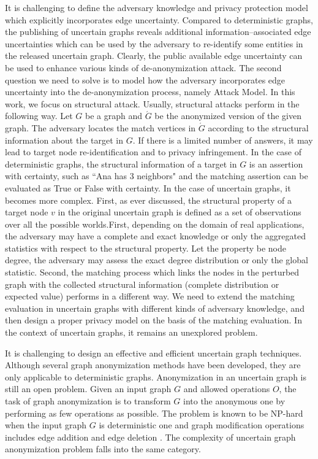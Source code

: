 It is challenging to define the adversary knowledge and privacy protection model which explicitly incorporates edge uncertainty. Compared to deterministic graphs, the publishing of uncertain graphs reveals additional information--associated edge uncertainties which can be used by the adversary to re-identify some entities in the released uncertain graph. Clearly, the public available edge uncertainty can be used to enhance various kinds of de-anonymization attack. The second question we need to solve is to model how the adversary incorporates edge uncertainty into the de-anonymization process, namely Attack Model. In this work, we focus on structural attack. Usually, structural attacks perform in the following way. Let $G$ be a graph and $\acute{G}$ be the anonymized version of the given graph. The adversary locates the match vertices in $\acute{G}$ according to the structural information about the target in $G$. If there is a limited number of answers, it may lead to target node re-identification and to privacy infringement. In the case of deterministic graphs, the structural information of a target in $G$ is an assertion with certainty, such as ``Ana has 3 neighbors" and the matching assertion can be evaluated as True or False with certainty. In the case of uncertain graphs, it becomes more complex. First, as ever discussed, the structural property of a target node $v$ in the original uncertain graph is defined as a set of observations over all the possible worlds.First, depending on the domain of real applications, the adversary may have a complete and exact knowledge  or only the aggregated statistics with respect to the structural property. Let the property be node degree, the adversary may assess the exact degree distribution or only the global statistic.  Second, the matching process which links the nodes in the perturbed graph with the collected structural information (complete distribution or expected value) performs in a different way. We need to extend the matching evaluation in uncertain graphs with different kinds of adversary knowledge, and then design a proper privacy model on the basis of the matching evaluation. In the context of uncertain graphs, it remains an unexplored problem. 

It is challenging to design an effective and efficient uncertain graph techniques. Although several graph anonymization methods have been developed, they are only applicable to deterministic graphs. Anonymization in an uncertain graph is still an open problem.  Given an input graph $G$ and allowed operations $O$, the task of graph anonymization is to transform $G$ into the anonymous one by performing as few operations as possible.  The problem is known to be NP-hard when the input graph $G$ is deterministic one and graph modification operations includes edge addition and edge deletion \cite{Hartung_Theory_2015}. The complexity of uncertain graph anonymization problem falls into the same category. 
